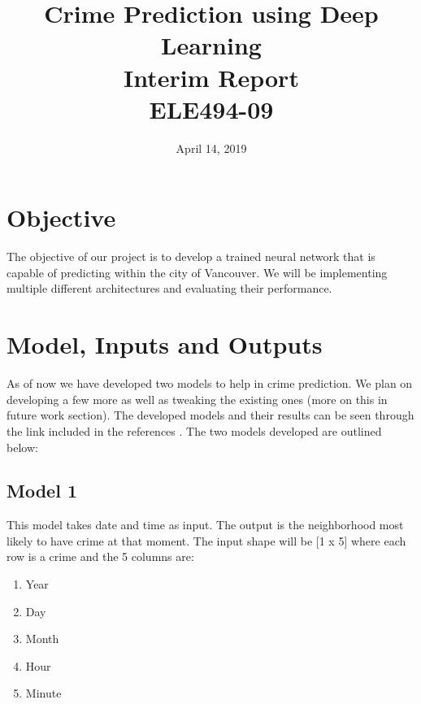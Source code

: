 \documentclass[conference]{IEEEtran}
\date{April 14, 2019}
\begin{document}
 
    \title{
        Crime Prediction using Deep Learning\\[0.3cm]
        \large Interim Report\\
        ELE494-09
    }

    \author{
        \and
    }

    \maketitle

    \section{Objective}

    The objective of our project is to develop a trained neural network
    that is capable of predicting within the city of Vancouver. 
    We will be implementing multiple different architectures and
    evaluating their performance.

    \section{Model, Inputs and Outputs}

    As of now we have developed two models to help in crime prediction. We plan on
    developing a few more as well as tweaking the existing ones (more on this in
    future work section). The developed models and their results can be seen through the link included in the references \cite{project}. 
    The two models developed are outlined below:

    \subsection{Model 1}

    This model takes date and time as input. The output is the neighborhood most
    likely to have crime at that moment. The input shape will be [1 x 5] where each
    row is a crime and the 5 columns are:

    \begin{enumerate}
        \item Year
        \item Day
        \item Month
        \item Hour
        \item Minute
    \end{enumerate}
\end{document}
